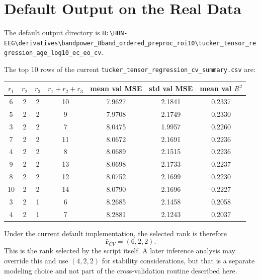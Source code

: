 \documentclass[11pt]{article}
\begin{document}
\section{Default Output on the Real Data}
The default output directory is
\texttt{H:\textbackslash HBN-EEG\textbackslash derivatives\textbackslash bandpower\_8band\_ordered\_preproc\_roi10\textbackslash tucker\_tensor\_regression\_age\_log10\_ec\_eo\_cv}.

The top 10 rows of the current \texttt{tucker\_tensor\_regression\_cv\_summary.csv} are:
\begin{center}
\begin{tabular}{ccccccc}
\toprule
$r_1$ & $r_2$ & $r_3$ & $r_1+r_2+r_3$ & mean val MSE & std val MSE & mean val $R^2$ \\
\midrule
6  & 2 & 2 & 10 & 7.9627 & 2.1841 & 0.2337 \\
5  & 2 & 2 & 9  & 7.9708 & 2.1749 & 0.2330 \\
3  & 2 & 2 & 7  & 8.0475 & 1.9957 & 0.2260 \\
7  & 2 & 2 & 11 & 8.0672 & 2.1691 & 0.2236 \\
4  & 2 & 2 & 8  & 8.0689 & 2.1515 & 0.2236 \\
9  & 2 & 2 & 13 & 8.0698 & 2.1733 & 0.2237 \\
8  & 2 & 2 & 12 & 8.0752 & 2.1699 & 0.2230 \\
10 & 2 & 2 & 14 & 8.0790 & 2.1696 & 0.2227 \\
3  & 2 & 1 & 6  & 8.2685 & 2.1458 & 0.2058 \\
4  & 2 & 1 & 7  & 8.2881 & 2.1243 & 0.2037 \\
\bottomrule
\end{tabular}
\end{center}

Under the current default implementation, the selected rank is therefore
\[
\widehat{\mathbf r}_{CV}=(6,2,2).
\]
This is the rank selected by the script itself. A later inference analysis may override this and use $(4,2,2)$ for stability considerations, but that is a separate modeling choice and not part of the cross-validation routine described here.
\end{document}
